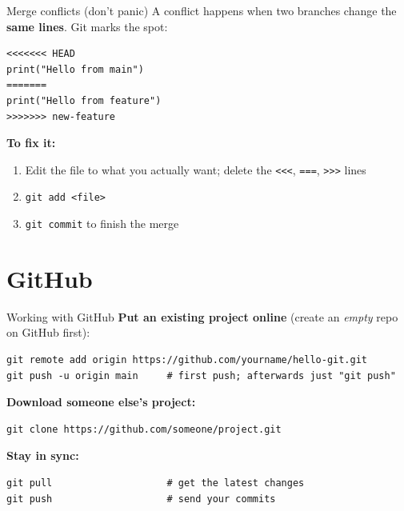 \documentclass[aspectratio=169,11pt]{beamer}
\newcommand{\cmd}[1]{\texttt{\color{gitred}#1}}
\begin{document}
\begin{frame}[fragile]{Merge conflicts (don't panic)}
  A conflict happens when two branches change the \textbf{same lines}.
  Git marks the spot:

\begin{lstlisting}[language={}]
<<<<<<< HEAD
print("Hello from main")
=======
print("Hello from feature")
>>>>>>> new-feature
\end{lstlisting}

  \textbf{To fix it:}
  \begin{enumerate}
    \item Edit the file to what you actually want; delete the
          \texttt{<{}<{}<}, \texttt{===}, \texttt{>{}>{}>} lines
    \item \cmd{git add <file>}
    \item \cmd{git commit} to finish the merge
  \end{enumerate}
\end{frame}

\section{GitHub}

\begin{frame}[fragile]{Working with GitHub}
  \textbf{Put an existing project online} (create an \emph{empty} repo on GitHub first):
\begin{lstlisting}
git remote add origin https://github.com/yourname/hello-git.git
git push -u origin main     # first push; afterwards just "git push"
\end{lstlisting}

  \textbf{Download someone else's project:}
\begin{lstlisting}
git clone https://github.com/someone/project.git
\end{lstlisting}

  \textbf{Stay in sync:}
\begin{lstlisting}
git pull                    # get the latest changes
git push                    # send your commits
\end{lstlisting}
\end{frame}
\end{document}
